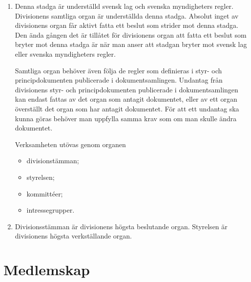 \documentclass{dvd}
\begin{document}
	\begin{enumerate}[label=\arabic* §, ref=\arabic*]
		\item Denna stadga är underställd svensk lag och svenska myndigheters regler.
		Divisionens samtliga organ är underställda denna stadga.
		Absolut inget av divisionens organ får aktivt fatta ett beslut som strider mot denna stadga.
		Den ända gången det är tillåtet för divisionens organ att fatta ett beslut som bryter mot denna stadga är när man anser att stadgan bryter mot svensk lag eller svenska myndigheters regler.

		Samtliga organ behöver även följa de regler som definieras i styr- och principdokumenten publicerade i dokumentsamlingen.
		Undantag från divisionens styr- och principdokumenten publicerade i dokumentsamlingen kan endast fattas av det organ som antagit dokumentet, eller av ett organ överställt det organ som har antagit dokumentet.
		För att ett undantag ska kunna göras behöver man uppfylla samma krav som om man skulle ändra dokumentet.

		Verksamheten utövas genom organen

		\begin{itemize}
			\item divisionstämman;
			\item styrelsen;
			\item kommittéer;
			\item intressegrupper.
		\end{itemize}

		\item Divisionsstämman är divisionens högsta beslutande organ.
		Styrelsen är divisionens högsta verkställande organ.
	\end{enumerate}

	\section{Medlemskap}
\end{document}
